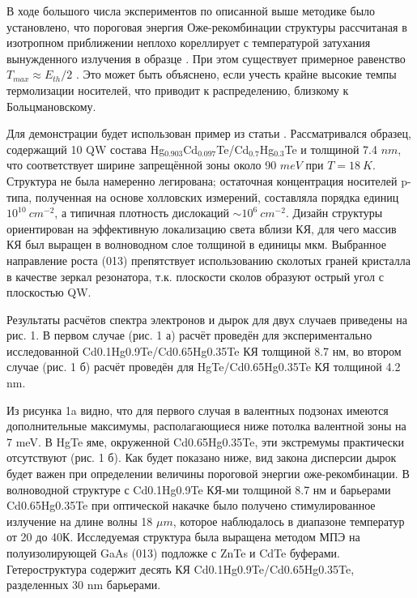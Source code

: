 
    В ходе большого числа экспериментов по описанной выше методике было установлено, что пороговая энергия 
    Оже-рекомбинации структуры рассчитаная в изотропном приближении неплохо кореллирует с температурой затухания 
    вынужденного излучения в образце . При этом существует примерное равенство $T_{max} \approx E_{th} / 2$ 
    \cite{TmaxEthEq}. Это может быть объяснено, если учесть крайне высокие темпы термолизации носителей, что приводит
    к распределению, близкому к Больцмановскому.

    Для демонстрации будет использован пример из статьи \cite{Utochkin}. Рассматривался образец, содержащий 10 QW
    состава Hg${}_{0.903}$Cd${}_{0.097}$Te/Cd${}_0.7$Hg${}_{0.3}$Te и толщиной 7.4 $nm$, что соответствует ширине 
    запрещённой зоны около 90 $meV$ при $T = 18 ~K$. Структура не была намеренно легирована; остаточная концентрация 
    носителей p-типа, полученная на основе холловских измерений, составляла порядка единиц $10^10~cm^{-2}$, а типичная 
    плотность дислокаций $\sim 10^6~cm^{-2}$. Дизайн структуры ориентирован на эффективную локализацию света вблизи КЯ, для 
    чего массив КЯ был выращен в волноводном слое толщиной в единицы мкм. Выбранное направление роста (013) 
    препятствует использованию сколотых граней кристалла в качестве зеркал резонатора, т.к. плоскости сколов образуют
    острый угол с плоскостью QW.

    Результаты расчётов спектра электронов и дырок для двух случаев приведены на рис. 1. В первом случае (рис. 1 а) расчёт
    проведён для экспериментально исследованной Cd0.1Hg0.9Te/Cd0.65Hg0.35Te КЯ толщиной 8.7 нм, во втором случае (рис. 1 б)
    расчёт проведён для HgTe/Cd0.65Hg0.35Te КЯ толщиной 4.2 nm.

    Из рисунка 1a видно, что для первого случая в валентных подзонах имеются дополнительные максимумы, располагающиеся ниже 
    потолка валентной зоны на 7 meV. В HgTe яме, окруженной Cd0.65Hg0.35Te, эти экстремумы практически отсутствуют (рис. 1 б). 
    Как будет показано ниже, вид закона дисперсии дырок будет важен при определении величины пороговой энергии оже-рекомбинации.
    В волноводной структуре с Cd0.1Hg0.9Te КЯ-ми толщиной 8.7 нм и барьерами Cd0.65Hg0.35Te при оптической накачке было получено 
    стимулированное излучение на длине волны 18 $\mu m$, которое наблюдалось в диапазоне температур от 20 до 40К. Исследуемая 
    структура была выращена методом МПЭ на полуизолирующей GaAs (013) подложке с ZnTe и CdTe буферами. Гетероструктура содержит 
    десять КЯ Cd0.1Hg0.9Te/Cd0.65Hg0.35Te, разделенных 30 nm барьерами.
    
